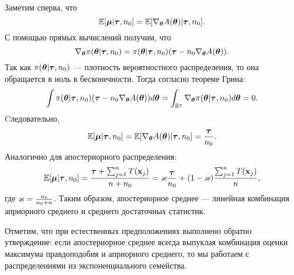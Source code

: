 Заметим сперва, что 
\[
\mathbb{E} [\boldsymbol{\mu} | \boldsymbol{\tau}, n_0] = \mathbb{E} [\nabla_{\boldsymbol{\theta}} A(\boldsymbol{\theta}) | \boldsymbol{\tau}, n_0].
\]
С помощью прямых вычислений получим, что
\[
\nabla_{\boldsymbol{\theta}} \pi(\boldsymbol{\theta}| \boldsymbol{\tau}, n_0) = \pi(\boldsymbol{\theta}| \boldsymbol{\tau}, n_0) (\boldsymbol{\tau} - n_0 \nabla_{\boldsymbol{\theta}} A(\boldsymbol{\theta})).
\]
Так как $\pi(\boldsymbol{\theta}| \boldsymbol{\tau}, n_0)$ --- плотность вероятностного распределения, то она обращается в ноль в бесконечности.
Тогда согласно теореме Грина:
\[
\int \pi(\boldsymbol{\theta}| \boldsymbol{\tau}, n_0) (\boldsymbol{\tau} - n_0 \nabla_{\boldsymbol{\theta}} A(\boldsymbol{\theta})) d\boldsymbol{\theta} =
\int_{\mathbb{R}^p} \nabla_{\boldsymbol{\theta}} \pi(\boldsymbol{\theta}| \boldsymbol{\tau}, n_0) d\boldsymbol{\theta} = 0.
\]
Cледовательно, 
\[
\mathbb{E} [\boldsymbol{\mu} | \boldsymbol{\tau}, n_0] = \mathbb{E} [\nabla_{\boldsymbol{\theta}} A(\boldsymbol{\theta}) | \boldsymbol{\tau}, n_0] = \frac{\boldsymbol{\tau}}{n_0}.
\]
Аналогично для апостериорного распределения:
\[
\mathbb{E} [\boldsymbol{\mu} | \boldsymbol{\tau}, n_0] = \frac{\boldsymbol{\tau} + \sum_{j = 1}^n T(\mathbf{x}_j)}{n + n_0} = \varkappa \frac{\boldsymbol{\tau}}{n_0} + (1 - \varkappa) \frac{\sum_{j = 1}^n T(\mathbf{x}_j)}{n},
\]
где $\varkappa = \frac{n_0}{n_0 + n}$.
Таким образом, апостериорное среднее --- линейная комбинация априорного среднего и среднего достаточных статистик.

Отметим, что при естественных предположениях выполнено обратно утверждение:
если апостериорное среднее всегда выпуклая комбинация оценки максимума правдоподобия и априорного среднего,
то мы работаем с распределениями из экспоненциального семейства.






